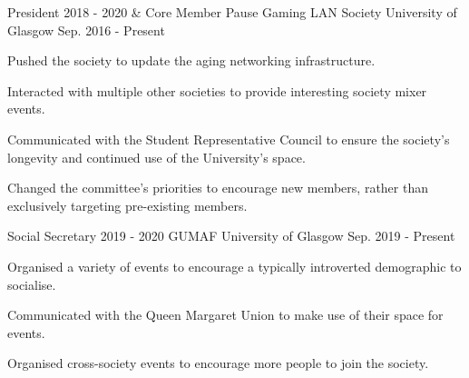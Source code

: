 

\begin{cventries}

  \cventry
    {President 2018 - 2020 \& Core Member} %
    {Pause Gaming LAN Society} %
    {University of Glasgow} %
    {Sep. 2016 - Present} %
    {
      \begin{cvitems} %
        \item Pushed the society to update the aging networking infrastructure.
        \item Interacted with multiple other societies to provide interesting society mixer events.
	\item Communicated with the Student Representative Council to ensure the society's longevity and continued use of the University's space.
	\item Changed the committee's priorities to encourage new members, rather than exclusively targeting pre-existing members.
      \end{cvitems}
    }
  \cventry
    {Social Secretary 2019 - 2020}
    {GUMAF}
    {University of Glasgow}
    {Sep. 2019 - Present}
    {
      \begin{cvitems}
        \item Organised a variety of events to encourage a typically introverted demographic to socialise.
	\item Communicated with the Queen Margaret Union to make use of their space for events.
	\item Organised cross-society events to encourage more people to join the society.
      \end{cvitems}
    }

\end{cventries}
